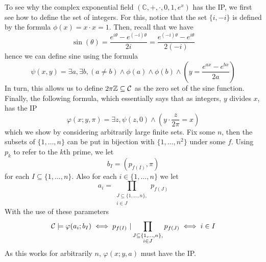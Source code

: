 \begin{exmp}
  To see why the complex exponential field $(\mathbb{C},+,\cdot,0,1,e^x)$ has the IP, we first see
  how to define the set of integers. For this, notice that the set $\{i,-i\}$ is defined by
  the formula $\phi(x) = x \cdot x = 1$. Then, recall that we have
  \begin{equation*}
    \sin(\theta) = \frac{e^{i\theta} - e^{(-i)\theta}}{2i}
                 = \frac{e^{(-i)\theta} - e^{i\theta}}{2(-i)}
  \end{equation*}
  hence we can define sine using the formula
  \begin{equation*}
    \psi(x,y) = \exists a, \exists b, (a \neq b) \land \phi(a) \land \phi(b) \land
      \left(y = \frac{e^{ax} - e^{bx}}{2a}\right)
  \end{equation*}
  In turn, this allows us to define $2\pi \mathbb{Z} \subseteq \mathbb{\mathcal{C}}$ as the zero set of the sine
  function. Finally, the following formula, which essentially says that as integers, $y$ divides
  $x$, has the IP
  \begin{equation*}
    \varphi(x;y,\pi) = \exists z, \psi(z,0) \land \left(y \cdot \frac{z}{2\pi} = x\right)
  \end{equation*}
  which we show by considering arbitrarily large finite sets. Fix some $n$, then the subsets of
  $\{1,\dots,n\}$ can be put in bijection with $\{1,\dots,n^2\}$ under some $f$. Using $p_k$
  to refer to the $k$th prime, we let
  \begin{equation*}
    b_I = (p_{f(I)}, \pi)
  \end{equation*}
  for each $I \subseteq \{1,\dots,n\}$. Also for each $i \in \{1,\dots,n\}$ we let
  \begin{equation*}
    a_i = \prod_{\substack{J \subseteq \{1,\dots,n\},\\ i \in J}} p_{f(J)}
  \end{equation*}
  With the use of these parameters
  \begin{equation*}
    \mathcal{C} \models \varphi(a_i;b_I)
      \iff p_{f(I)}\ | \prod_{\substack{J \subseteq \{1,\dots,n\},\\ i \in J}} p_{f(J)}
      \iff i \in I
  \end{equation*}
  As this works for arbitrarily $n$, $\varphi(x;y,a)$ must have the IP.
\end{exmp}
